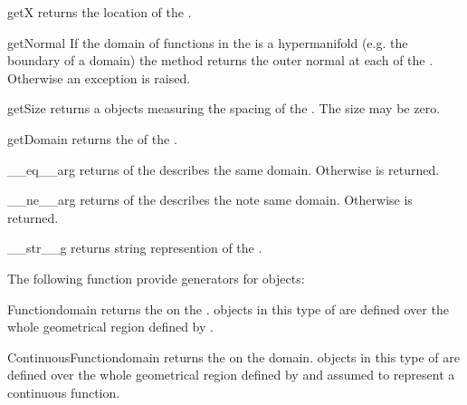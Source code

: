 \begin{methoddesc}[FunctionSpace]{getX}{}
returns the location of the \DataSamplePoints.
\end{methoddesc}

\begin{methoddesc}[FunctionSpace]{getNormal}{}
If the domain of functions in the \FunctionSpace 
is a hypermanifold (e.g. the boundary of a domain)
the method returns the outer normal at each of the 
\DataSamplePoints. Otherwise an exception is raised.
\end{methoddesc}

\begin{methoddesc}[FunctionSpace]{getSize}{}
returns a \Data objects measuring the spacing of the \DataSamplePoints.  
The size may be zero.
\end{methoddesc}

\begin{methoddesc}[FunctionSpace]{getDomain}{}
returns the \Domain of the \FunctionSpace.
\end{methoddesc}

\begin{methoddesc}[FunctionSpace]{__eq__}{arg}
returns \True of the \Domain {} describes the same domain. Otherwise
\False is returned.
\end{methoddesc}

\begin{methoddesc}[FunctionSpace]{__ne__}{arg}
returns \True of the \Domain {} describes the note same domain. 
Otherwise \False is returned.
\end{methoddesc}

\begin{methoddesc}[Domain]{__str__}{g}
returns string represention of the \Domain.
\end{methoddesc}

The following function provide generators for \FunctionSpace objects:
\begin{funcdesc}{Function}{domain}
returns the \Function on the \Domain {}. \Data objects in this type of \Function
are defined over the whole geometrical region defined by . 
\end{funcdesc}

\begin{funcdesc}{ContinuousFunction}{domain}
returns the \ContinuousFunction on the \Domain domain. \Data objects in this type of \Function
are defined over the whole geometrical region defined by  and assumed to represent
a continuous function.
\end{funcdesc}

